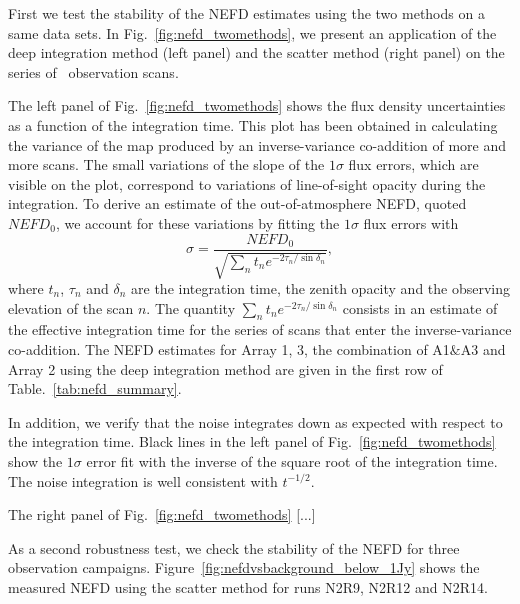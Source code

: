 First we test the stability of the NEFD estimates using the two
methods on a same data sets. In Fig.~\ref{fig:nefd_twomethods}, we
present an application of the deep integration method (left panel) and
the scatter method (right panel) on
the series of \hls\ observation scans.

The left panel of Fig.~\ref{fig:nefd_twomethods} shows the flux density
uncertainties as a function of the integration time. This plot has
been obtained in calculating the variance of the map produced by an
inverse-variance co-addition of more and more scans. The small
variations of the slope of the $1\sigma$ flux errors, which are visible on the
plot, correspond to variations of line-of-sight opacity during the
integration. To derive an estimate of the out-of-atmosphere
NEFD, quoted $NEFD_0$, we account for these variations by fitting the
$1\sigma$ flux errors with
\begin{equation}
  \sigma = \frac{NEFD_0}{\sqrt{\sum_{n}t_n e^{-2\tau_n/\sin\delta_n}}},
  \label{eq:sigma_tau_w8}
\end{equation}
where $t_n$, $\tau_n$ and $\delta_n$ are the integration time, the
zenith opacity and the observing elevation of the scan $n$. The
quantity $\sum_{n}t_n e^{-2\tau_n/\sin\delta_n}$ consists in an
estimate of the effective integration time for the series of scans
that enter the inverse-variance co-addition. The NEFD estimates for
Array 1, 3, the combination of A1$\&$A3 and Array 2 using the deep
integration method are given in the first row of
Table.~\ref{tab:nefd_summary}.

In addition, we verify that the noise integrates down as expected with
respect to the integration time. Black lines in the left panel of
Fig.~\ref{fig:nefd_twomethods} show the $1\sigma$ error fit with the
inverse of the square root of the integration time. The noise
integration is well consistent with $t^{-1/2}$.

The right panel of Fig.~\ref{fig:nefd_twomethods} [...]

As a second robustness test, we check the stability of the NEFD for
three observation
campaigns. Figure~\ref{fig:nefdvsbackground_below_1Jy} shows the
measured NEFD using the scatter method for runs N2R9, N2R12 and
N2R14. 

